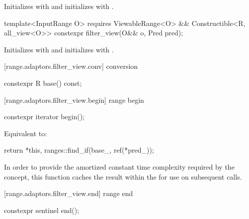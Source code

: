 \begin{itemdescr}
\pnum
\effects Initializes  with  and initializes
 with .
\end{itemdescr}

%
\begin{itemdecl}
template<InputRange O>
  requires ViewableRange<O> && Constructible<R, all_view<O>>
constexpr filter_view(O&& o, Pred pred);
\end{itemdecl}

\begin{itemdescr}
\pnum
\effects Initializes  with 
and initializes  with .
\end{itemdescr}

[range.adaptors.filter_view.conv]{ conversion}

%
\begin{itemdecl}
constexpr R base() const;
\end{itemdecl}

\begin{itemdescr}
\pnum
\oldtxt{\returns}  
\end{itemdescr}

[range.adaptors.filter_view.begin]{ range begin}

%
\begin{itemdecl}
constexpr iterator begin();
\end{itemdecl}

\begin{itemdescr}
\pnum
\effects Equivalent to:
\begin{codeblock}
return {*this, ranges::find_if(base_, ref(*pred_))};
\end{codeblock}

\pnum
\remarks In order to provide the amortized constant time complexity required by
the  concept, this function caches the result within the
 for use on subsequent calls.
\end{itemdescr}

[range.adaptors.filter_view.end]{ range end}

%
\begin{itemdecl}
constexpr sentinel end();
\end{itemdecl}

